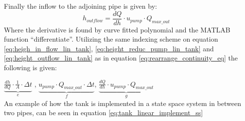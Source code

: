 Finally the inflow to the adjoining pipe is given by:
\begin{equation} \label{eq:height_outflow_lin_tank}
	h_{outflow} = \frac{dQ}{dh} \cdot u_{pump} \cdot Q_{max\_out}
\end{equation}
Where the derivative is found by curve fitted polynomial and the MATLAB function ``differentiate''.
Utilizing the same indexing scheme on equation \ref{eq:heigh_in_flow_lin_tank}, \ref{eq:height_reduc_pump_lin_tank} and \ref {eq:height_outflow_lin_tank} as in equation \ref{eq:rearrange_continuity_eq} the following is given:


	$\underbrace{\frac{dh}{dQ} \cdot \frac{1}{A} \cdot \Delta t}_{e}$ , $\underbrace{u_{pump} \cdot Q_{max\_out} \cdot \Delta t}_{f}$, $\underbrace{\frac{dQ}{dh} \cdot u_{pump} \cdot Q_{max\_out}}_{g}$ 
\\
An example of how the tank is implemented in a state space system in between two pipes, can be seen in equation \ref{eq:tank_linear_implement_ss}

